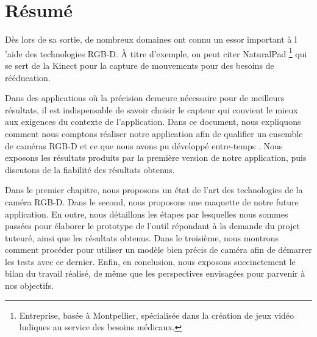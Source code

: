 \documentclass[a4paper, 12pt]{book}
\newcounter{program}[subsection]
\begin{document}
\chapter*{Résumé}
Dès lors de sa sortie, de nombreux domaines ont connu un essor important à l 'aide des technologies RGB-D. À titre d'exemple, on peut citer NaturalPad \footnote{Entreprise, basée à Montpellier, spécialisée dans la création de jeux vidéo ludiques au service des besoins médicaux.} qui se sert de la Kinect pour la capture de mouvements pour des besoins de rééducation.	
\par Dans des applications où la précision demeure nécessaire pour de meilleurs résultats, il est indispensable de savoir choisir le capteur qui convient le mieux aux exigences du contexte de l'application.
Dans ce document, nous expliquons comment nous comptons réaliser notre application afin de qualifier un ensemble de caméras RGB-D et ce que nous avons pu développé entre-temps . Nous exposons les résultats produits par la première version de notre application, puis discutons de la fiabilité des résultats obtenus.
\par Dans le premier chapitre, nous proposons un état de l'art des technologies de la caméra RGB-D. Dans le second, nous proposons une maquette de notre future application. En outre, nous détaillons les étapes par lesquelles nous sommes passées pour élaborer le prototype de l'outil répondant à la demande du projet tuteuré, ainsi que les résultats obtenus. Dans le troisième, nous montrons comment procéder pour utiliser un modèle bien précis de caméra afin de démarrer les tests avec ce dernier. Enfin, en conclusion, nous exposons succinctement le bilan du travail réalisé, de même que les perspectives envisagées pour parvenir à nos objectifs.

\tableofcontents
\listoffigures
\mainmatter
\end{document}
